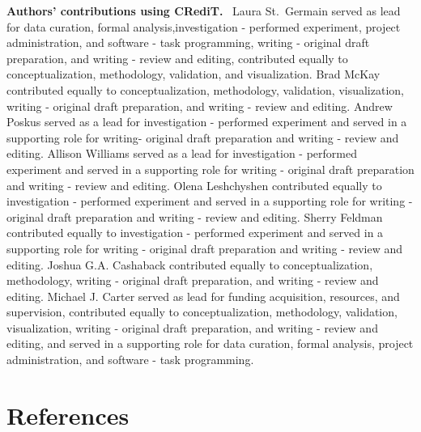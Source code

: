 \documentclass[
  man, donotrepeattitle,floatsintext]{apa7}
\begin{document}
\noindent
\textbf{Authors' contributions using CRediT.} ~Laura St.~Germain served as lead for data curation, formal analysis,investigation - performed experiment, project administration, and software - task programming, writing - original draft preparation, and writing - review and editing, contributed equally to conceptualization, methodology, validation, and visualization. Brad McKay contributed equally to conceptualization, methodology, validation, visualization, writing - original draft preparation, and writing - review and editing. Andrew Poskus served as a lead for investigation - performed experiment and served in a supporting role for writing- original draft preparation and writing - review and editing. Allison Williams served as a lead for investigation - performed experiment and served in a supporting role for writing - original draft preparation and writing - review and editing. Olena Leshchyshen contributed equally to investigation - performed experiment and served in a supporting role for writing - original draft preparation and writing - review and editing. Sherry Feldman contributed equally to investigation - performed experiment and served in a supporting role for writing - original draft preparation and writing - review and editing. Joshua G.A. Cashaback contributed equally to conceptualization, methodology, writing - original draft preparation, and writing - review and editing. Michael J. Carter served as lead for funding acquisition, resources, and supervision, contributed equally to conceptualization, methodology, validation, visualization, writing - original draft preparation, and writing - review and editing, and served in a supporting role for data curation, formal analysis, project administration, and software - task programming.

\hypertarget{references}{%
\section{References}\label{references}}

\vspace{2ex}
\end{document}
